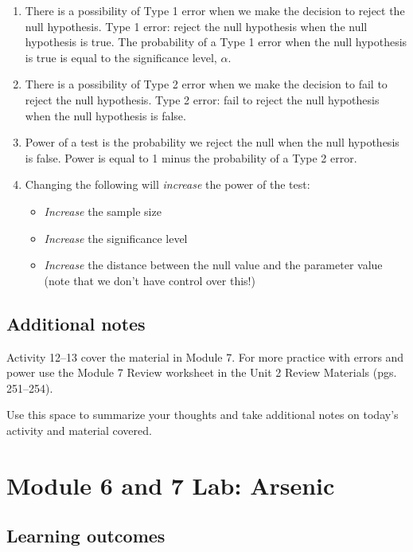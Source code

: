 \documentclass[
]{report}
\begin{document}
\begin{enumerate}
\def\labelenumi{\arabic{enumi}.}
\item
  There is a possibility of Type 1 error when we make the decision to reject the null hypothesis. Type 1 error: reject the null hypothesis when the null hypothesis is true. The probability of a Type 1 error when the null hypothesis is true is equal to the significance level, \(\alpha\).
\item
  There is a possibility of Type 2 error when we make the decision to fail to reject the null hypothesis. Type 2 error: fail to reject the null hypothesis when the null hypothesis is false.
\item
  Power of a test is the probability we reject the null when the null hypothesis is false. Power is equal to 1 minus the probability of a Type 2 error.
\item
  Changing the following will \emph{increase} the power of the test:

  \begin{itemize}
  \item
    \emph{Increase} the sample size
  \item
    \emph{Increase} the significance level
  \item
    \emph{Increase} the distance between the null value and the parameter value (note that we don't have control over this!)
  \end{itemize}
\end{enumerate}

\subsection{Additional notes}\label{additional-notes-12}

Activity 12--13 cover the material in Module 7. For more practice with errors and power use the Module 7 Review worksheet in the Unit 2 Review Materials (pgs. 251--254).

Use this space to summarize your thoughts and take additional notes on today's activity and material covered.

\newpage

\section{Module 6 and 7 Lab: Arsenic}\label{module-6-and-7-lab-arsenic}


\subsection{Learning outcomes}\label{learning-outcomes-14}
\end{document}
